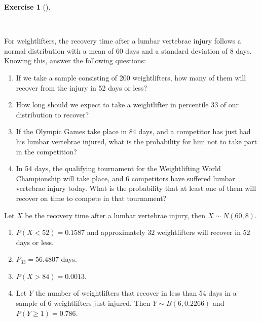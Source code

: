 \documentclass[
  a4paper,
]{scrreport}
\theoremstyle{definition}
\newtheorem{exercise}{Exercise}[chapter]
\theoremstyle{remark}
\begin{document}
\begin{exercise}[]\protect\hypertarget{exr-3}{}\label{exr-3}

~

For weightlifters, the recovery time after a lumbar vertebrae injury
follows a normal distribution with a mean of 60 days and a standard
deviation of 8 days. Knowing this, answer the following questions:

\begin{enumerate}
\def\labelenumi{\alph{enumi}.}
\item
  If we take a sample consisting of 200 weightlifters, how many of them
  will recover from the injury in 52 days or less?
\item
  How long should we expect to take a weightlifter in percentile 33 of
  our distribution to recover?
\item
  If the Olympic Games take place in 84 days, and a competitor has just
  had his lumbar vertebrae injured, what is the probability for him not
  to take part in the competition?
\item
  In 54 days, the qualifying tournament for the Weightlifting World
  Championship will take place, and 6 competitors have suffered lumbar
  vertebrae injury today. What is the probability that at least one of
  them will recover on time to compete in that tournament?
\end{enumerate}

\begin{tcolorbox}[enhanced jigsaw, colback=white, title=\textcolor{quarto-callout-tip-color}{\faLightbulb}\hspace{0.5em}{Solution}, arc=.35mm, colbacktitle=quarto-callout-tip-color!10!white, breakable, leftrule=.75mm, colframe=quarto-callout-tip-color-frame, opacitybacktitle=0.6, left=2mm, toptitle=1mm, bottomtitle=1mm, titlerule=0mm, rightrule=.15mm, bottomrule=.15mm, toprule=.15mm, opacityback=0, coltitle=black]

Let \(X\) be the recovery time after a lumbar vertebrae injury, then
\(X\sim N(60, 8)\).

\begin{enumerate}
\def\labelenumi{\alph{enumi}.}
\item
  \(P(X<52) = 0.1587\) and approximately \(32\) weightlifters will
  recover in 52 days or less.
\item
  \(P_{33} = 56.4807\) days.
\item
  \(P(X>84) = 0.0013\).
\item
  Let \(Y\) the number of weightlifters that recover in less than 54
  days in a sample of 6 weightlifters just injured. Then
  \(Y\sim B(6, 0.2266)\) and \(P(Y\geq 1) = 0.786\).
\end{enumerate}

\end{tcolorbox}

\end{exercise}
\end{document}
